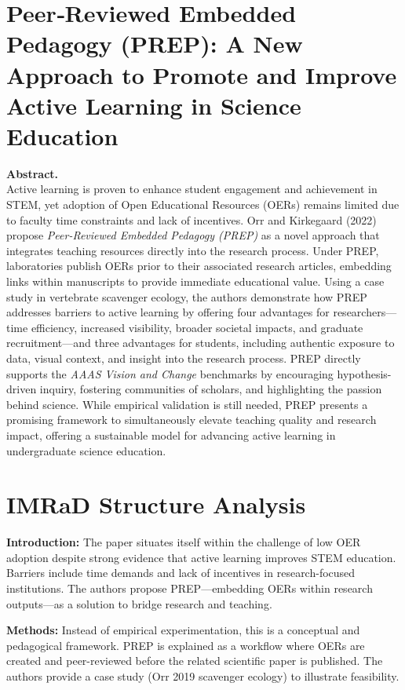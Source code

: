 \documentclass[12pt,a4paper]{article}
\begin{document}
\section*{Peer‐Reviewed Embedded Pedagogy (PREP):
A New Approach to Promote and 
Improve Active Learning in Science Education}

\noindent
\textbf{Abstract.} \\
Active learning is proven to enhance student engagement and achievement in STEM, yet adoption of Open Educational Resources (OERs) remains limited due to faculty time constraints and lack of incentives. Orr and Kirkegaard (2022) propose \textit{Peer-Reviewed Embedded Pedagogy (PREP)} as a novel approach that integrates teaching resources directly into the research process. Under PREP, laboratories publish OERs prior to their associated research articles, embedding links within manuscripts to provide immediate educational value. Using a case study in vertebrate scavenger ecology, the authors demonstrate how PREP addresses barriers to active learning by offering four advantages for researchers—time efficiency, increased visibility, broader societal impacts, and graduate recruitment—and three advantages for students, including authentic exposure to data, visual context, and insight into the research process. PREP directly supports the \textit{AAAS Vision and Change} benchmarks by encouraging hypothesis-driven inquiry, fostering communities of scholars, and highlighting the passion behind science. While empirical validation is still needed, PREP presents a promising framework to simultaneously elevate teaching quality and research impact, offering a sustainable model for advancing active learning in undergraduate science education.

\vspace{1.5em}

\newpage
\section*{IMRaD Structure Analysis}

\textbf{Introduction:}  
The paper situates itself within the challenge of low OER adoption despite strong evidence that active learning improves STEM education. Barriers include time demands and lack of incentives in research-focused institutions. The authors propose PREP—embedding OERs within research outputs—as a solution to bridge research and teaching.

\medskip
\textbf{Methods:}  
Instead of empirical experimentation, this is a conceptual and pedagogical framework. PREP is explained as a workflow where OERs are created and peer-reviewed before the related scientific paper is published. The authors provide a case study (Orr 2019 scavenger ecology) to illustrate feasibility.
\end{document}

